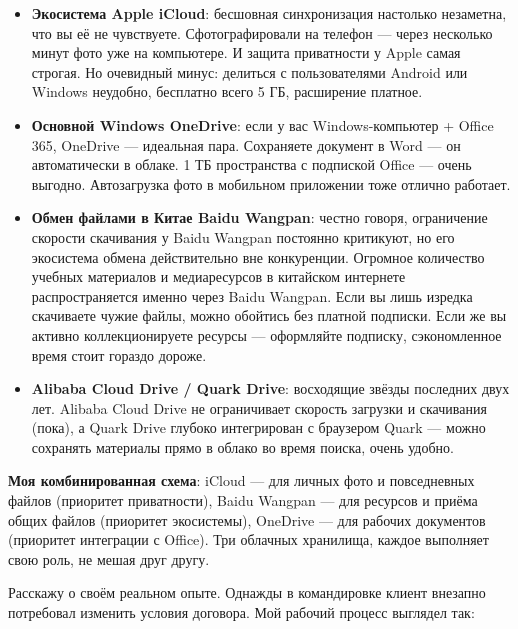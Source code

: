 \begin{itemize}
  \item \textbf{Экосистема Apple iCloud}: бесшовная синхронизация настолько незаметна, что вы её не чувствуете. Сфотографировали на телефон — через несколько минут фото уже на компьютере. И защита приватности у Apple самая строгая. Но очевидный минус: делиться с пользователями Android или Windows неудобно, бесплатно всего 5 ГБ, расширение платное.
  \item \textbf{Основной Windows OneDrive}: если у вас Windows-компьютер + Office 365, OneDrive — идеальная пара. Сохраняете документ в Word — он автоматически в облаке. 1 ТБ пространства с подпиской Office — очень выгодно. Автозагрузка фото в мобильном приложении тоже отлично работает.
  \item \textbf{Обмен файлами в Китае Baidu Wangpan}: честно говоря, ограничение скорости скачивания у Baidu Wangpan постоянно критикуют, но его экосистема обмена действительно вне конкуренции. Огромное количество учебных материалов и медиаресурсов в китайском интернете распространяется именно через Baidu Wangpan. Если вы лишь изредка скачиваете чужие файлы, можно обойтись без платной подписки. Если же вы активно коллекционируете ресурсы — оформляйте подписку, сэкономленное время стоит гораздо дороже.
  \item \textbf{Alibaba Cloud Drive / Quark Drive}: восходящие звёзды последних двух лет. Alibaba Cloud Drive не ограничивает скорость загрузки и скачивания (пока), а Quark Drive глубоко интегрирован с браузером Quark — можно сохранять материалы прямо в облако во время поиска, очень удобно.
\end{itemize}

\textbf{Моя комбинированная схема}: iCloud — для личных фото и повседневных файлов (приоритет приватности), Baidu Wangpan — для ресурсов и приёма общих файлов (приоритет экосистемы), OneDrive — для рабочих документов (приоритет интеграции с Office). Три облачных хранилища, каждое выполняет свою роль, не мешая друг другу.


Расскажу о своём реальном опыте. Однажды в командировке клиент внезапно потребовал изменить условия договора. Мой рабочий процесс выглядел так:

